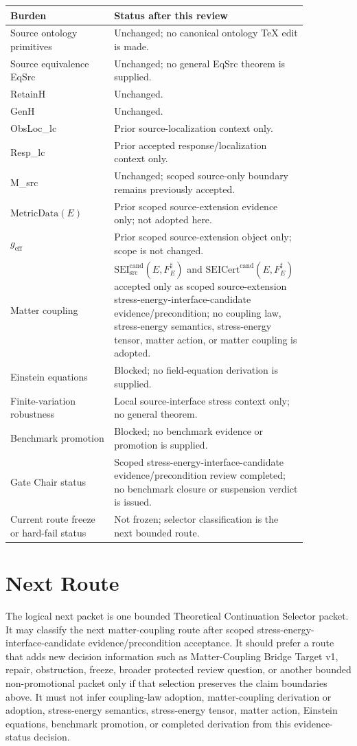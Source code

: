\documentclass[11pt]{article}
\newcommand{\MetricData}{\mathrm{MetricData}}
\newcommand{\geff}{g_{\mathrm{eff}}}
\newcommand{\SEICand}{\mathrm{SEI}_{\mathrm{src}}^{\mathrm{cand}}}
\newcommand{\SEICertCand}{\mathrm{SEICert}^{\mathrm{cand}}}
\begin{document}
\begin{longtable}{p{0.30\linewidth}p{0.56\linewidth}}
\toprule
Burden & Status after this review \\
\midrule
Source ontology primitives & Unchanged; no canonical ontology TeX edit is made. \\
Source equivalence EqSrc & Unchanged; no general EqSrc theorem is supplied. \\
RetainH & Unchanged. \\
GenH & Unchanged. \\
ObsLoc\_lc & Prior source-localization context only. \\
Resp\_lc & Prior accepted response/localization context only. \\
M\_src & Unchanged; scoped source-only boundary remains previously accepted. \\
\(\MetricData(E)\) & Prior scoped source-extension evidence only; not adopted here. \\
\(\geff\) & Prior scoped source-extension object only; scope is not changed. \\
Matter coupling & \(\SEICand(E,F_E^\sharp)\) and \(\SEICertCand(E,F_E^\sharp)\) accepted only as scoped source-extension stress-energy-interface-candidate evidence/precondition; no coupling law, stress-energy semantics, stress-energy tensor, matter action, or matter coupling is adopted. \\
Einstein equations & Blocked; no field-equation derivation is supplied. \\
Finite-variation robustness & Local source-interface stress context only; no general theorem. \\
Benchmark promotion & Blocked; no benchmark evidence or promotion is supplied. \\
Gate Chair status & Scoped stress-energy-interface-candidate evidence/precondition review completed; no benchmark closure or suspension verdict is issued. \\
Current route freeze or hard-fail status & Not frozen; selector classification is the next bounded route. \\
\bottomrule
\end{longtable}

\section{Next Route}

The logical next packet is one bounded Theoretical Continuation Selector
packet. It may classify the next matter-coupling route after scoped
stress-energy-interface-candidate evidence/precondition acceptance. It should
prefer a route that adds new decision information such as Matter-Coupling
Bridge Target v1, repair, obstruction, freeze, broader protected review
question, or another bounded non-promotional packet only if that selection
preserves the claim boundaries above. It must not infer coupling-law adoption,
matter-coupling derivation or adoption, stress-energy semantics,
stress-energy tensor, matter action, Einstein equations, benchmark promotion,
or completed derivation from this evidence-status decision.
\end{document}
